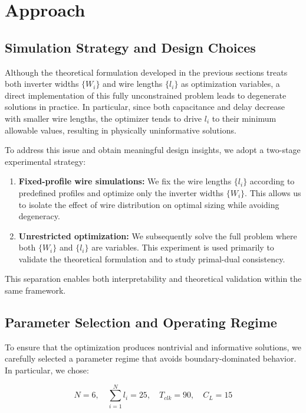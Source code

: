 \documentclass{article}
\begin{document}
\section{Approach}

\subsection{Simulation Strategy and Design Choices}

Although the theoretical formulation developed in the previous sections treats both inverter widths $\{W_i\}$ and wire lengths $\{l_i\}$ as optimization variables, a direct implementation of this fully unconstrained problem leads to degenerate solutions in practice. In particular, since both capacitance and delay decrease with smaller wire lengths, the optimizer tends to drive $l_i$ to their minimum allowable values, resulting in physically uninformative solutions.

To address this issue and obtain meaningful design insights, we adopt a two-stage experimental strategy:

\begin{enumerate}
    \item \textbf{Fixed-profile wire simulations:} We fix the wire lengths $\{l_i\}$ according to predefined profiles and optimize only the inverter widths $\{W_i\}$. This allows us to isolate the effect of wire distribution on optimal sizing while avoiding degeneracy.
    
    \item \textbf{Unrestricted optimization:} We subsequently solve the full problem where both $\{W_i\}$ and $\{l_i\}$ are variables. This experiment is used primarily to validate the theoretical formulation and to study primal-dual consistency.
\end{enumerate}

This separation enables both interpretability and theoretical validation within the same framework.

\subsection{Parameter Selection and Operating Regime}

To ensure that the optimization produces nontrivial and informative solutions, we carefully selected a parameter regime that avoids boundary-dominated behavior. In particular, we chose:

\[ N = 6, \quad \sum_{i=1}^N l_i = 25, \quad T_{clk} = 90, \quad C_L = 15 \]
\end{document}
